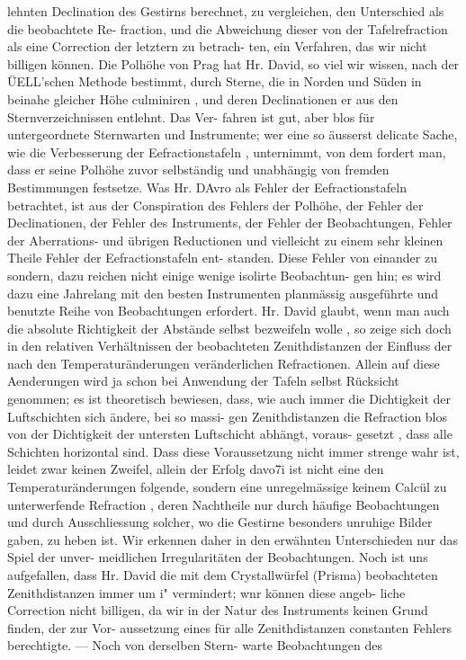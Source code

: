 \documentclass[12pt,a4paper]{article}
\begin{document}
{{{{{{{{lehnten  Declination  des  Gestirns  berechnet,   zu   vergleichen,    den    Unterschied   als  die   beobachtete  Re- fraction,  und  die  Abweichung  dieser  von  der  Tafelrefraction  als  eine  Correction  der  letztern  zu  betrach- ten, ein  Verfahren,  das  wir  nicht  billigen  können.      Die  Polhöhe  von  Prag  hat  Hr.  David,  so  viel  wir wissen,  nach  der  ÜELL'schen  Methode  bestimmt,  durch  Sterne,    die    in   Norden   und   Süden  in    beinahe gleicher  Höhe  culminiren ,  und  deren  Declinationen  er  aus  den  Sternverzeichnissen   entlehnt.     Das  Ver- fahren ist  gut,  aber  blos  für  untergeordnete  Sternwarten  und  Instrumente;  wer  eine  so  äusserst  delicate Sache,  wie  die  Verbesserung  der  Eefractionstafeln ,   unternimmt,    von  dem  fordert  man,    dass    er  seine Polhöhe   zuvor   selbständig   und   unabhängig    von  fremden  Bestimmungen  festsetze.      Was  Hr.  DAvro  als Fehler  der  Eefractionstafeln  betrachtet,    ist   aus   der  Conspiration  des  Fehlers  der  Polhöhe,    der  Fehler der  Declinationen,  der  Fehler  des  Instruments,  der  Fehler  der  Beobachtungen,  Fehler   der  Aberrations- und übrigen  Reductionen  und  vielleicht  zu  einem  sehr  kleinen  Theile  Fehler  der  Eefractionstafeln   ent- standen.    Diese  Fehler  von  einander  zu  sondern,  dazu  reichen  nicht  einige   wenige  isolirte  Beobachtun- gen hin;  es  wird  dazu  eine  Jahrelang  mit  den  besten  Instrumenten  planmässig  ausgeführte  und  benutzte Reihe  von  Beobachtungen  erfordert.      Hr.  David  glaubt,    wenn    man    auch    die  absolute  Richtigkeit  der Abstände  selbst  bezweifeln  wolle ,    so  zeige   sich  doch   in    den  relativen  Verhältnissen  der  beobachteten Zenithdistanzen  der  Einfluss  der  nach  den  Temperaturänderungen   veränderlichen    Refractionen.      Allein auf  diese  Aenderungen  wird   ja  schon  bei    Anwendung    der   Tafeln   selbst  Rücksicht   genommen;    es  ist theoretisch  bewiesen,  dass,  wie  auch  immer  die  Dichtigkeit  der  Luftschichten  sich  ändere,  bei  so  massi- gen Zenithdistanzen  die  Refraction  blos  von  der  Dichtigkeit  der  untersten  Luftschicht  abhängt,  voraus- gesetzt ,  dass  alle  Schichten  horizontal  sind.      Dass   diese  Voraussetzung   nicht  immer  strenge  wahr  ist, leidet  zwar  keinen  Zweifel,    allein  der  Erfolg  davo7i  ist  nicht  eine  den  Temperaturänderungen  folgende, sondern  eine  unregelmässige  keinem  Calcül    zu  unterwerfende  Refraction ,    deren   Nachtheile   nur    durch häufige  Beobachtungen  und  durch  Ausschliessung  solcher,    wo   die    Gestirne    besonders    unruhige    Bilder gaben,  zu  heben  ist.      Wir  erkennen   daher   in    den  erwähnten  Unterschieden    nur  das  Spiel  der  unver- meidlichen Irregularitäten  der  Beobachtungen.      Noch  ist  uns  aufgefallen,   dass    Hr.  David  die  mit  dem Crystallwürfel  (Prisma)  beobachteten  Zenithdistanzen  immer  um  i"  vermindert;  wnr  können  diese  angeb- liche Correction  nicht  billigen,  da  wir  in  der  Natur  des  Instruments  keinen  Grund  finden,  der  zur  Vor- aussetzung eines  für  alle  Zenithdistanzen  constanten  Fehlers  berechtigte.  ---     Noch  von  derselben  Stern- warte Beobachtungen  des  }}}}}}}}
\end{document}
